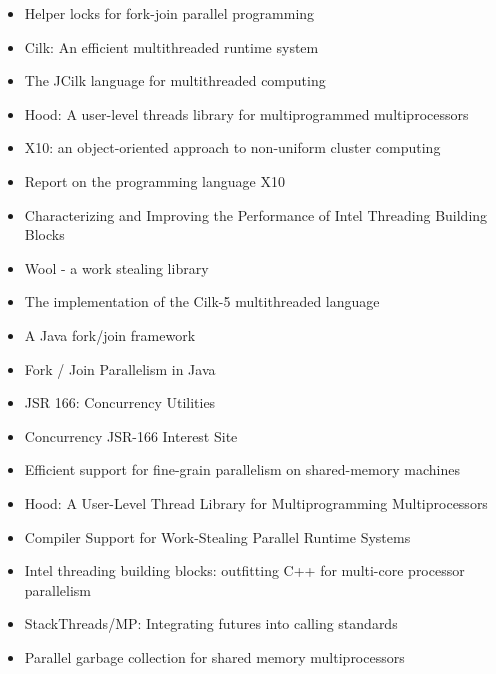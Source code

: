 \begin{itemize}
\item[\textbullet] Helper locks for fork-join parallel programming
  \cite{Agrawal2010}
\item[\checkmark] Cilk: An efficient multithreaded runtime system
  \cite{Blumofe1995}
\item[\checkmark] The JCilk language for multithreaded computing
  \cite{Danaher2005}
\item[\textbullet] Hood: A user-level threads library for
  multiprogrammed multiprocessors \cite{Blumofe1998}
\item[\textbullet] X10: an object-oriented approach to non-uniform
  cluster computing \cite{Charles2005}
\item[\textbullet] Report on the programming language X10
  \cite{Saraswat2010}
\item[\checkmark] Characterizing and Improving the Performance of
  Intel Threading Building Blocks \cite{Contreras2008}
\item[\texttimes] Wool - a work stealing library \cite{Faxen2009}
\item[\checkmark] The implementation of the Cilk-5 multithreaded
  language \cite{Frigo1998}
\item[\checkmark] A Java fork/join framework \cite{Lea2000}
\item[\checkmark] Fork / Join Parallelism in Java \cite{Lea2000a}
\item[\checkmark] JSR 166: Concurrency Utilities \cite{Lea2004}
\item[\checkmark] Concurrency JSR-166 Interest Site \cite{Lea2006}
\item[\textbullet] Efficient support for fine-grain parallelism on
  shared-memory machines \cite{Lowenthal1998}
\item[\textbullet] Hood: A User-Level Thread Library for
  Multiprogramming Multiprocessors \cite{Papadopoulos1998}
\item[\textbullet] Compiler Support for Work-Stealing Parallel Runtime
  Systems \cite{Raman2009}
\item[\checkmark] Intel threading building blocks: outfitting C++ for
  multi-core processor parallelism \cite{Reinders2007}
\item[\textbullet] StackThreads/MP: Integrating futures into calling
  standards \cite{Taura1999}
\item[\textbullet] Parallel garbage collection for shared memory
  multiprocessors \cite{Flood2001}
\end{itemize}


